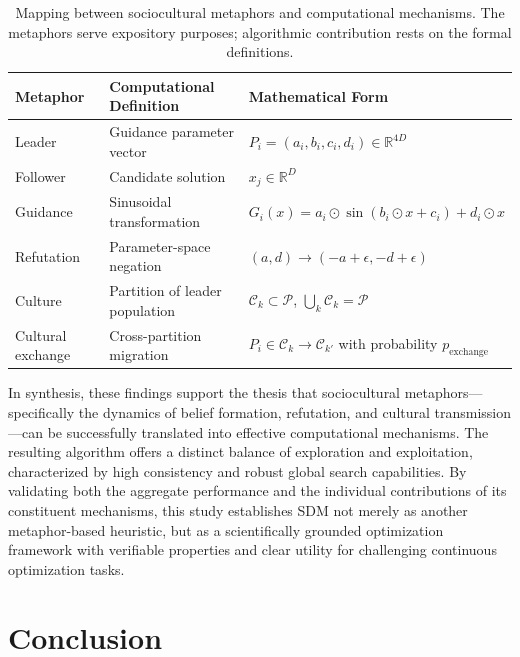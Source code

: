 \documentclass[11pt]{article}
\begin{document}
\begin{table}[ht]
\centering
\caption{Mapping between sociocultural metaphors and computational mechanisms. The metaphors serve expository purposes; algorithmic contribution rests on the formal definitions.}
\label{tab:metaphor_mapping}
\small
\begin{tabular}{@{}lll@{}}
\toprule
\textbf{Metaphor} & \textbf{Computational Definition} & \textbf{Mathematical Form} \\
\midrule
Leader & Guidance parameter vector & $P_i = (a_i, b_i, c_i, d_i) \in \mathbb{R}^{4D}$ \\
Follower & Candidate solution & $x_j \in \mathbb{R}^D$ \\
Guidance & Sinusoidal transformation & $G_i(x) = a_i \odot \sin(b_i \odot x + c_i) + d_i \odot x$ \\
Refutation & Parameter-space negation & $(a, d) \to (-a + \epsilon, -d + \epsilon)$ \\
Culture & Partition of leader population & $\mathcal{C}_k \subset \mathcal{P}$, $\bigcup_k \mathcal{C}_k = \mathcal{P}$ \\
Cultural exchange & Cross-partition migration & $P_i \in \mathcal{C}_k \to \mathcal{C}_{k'}$ with probability $p_{\text{exchange}}$ \\
\bottomrule
\end{tabular}
\end{table}

In synthesis, these findings support the thesis that sociocultural metaphors---specifically the dynamics of belief formation, refutation, and cultural transmission---can be successfully translated into effective computational mechanisms. The resulting algorithm offers a distinct balance of exploration and exploitation, characterized by high consistency and robust global search capabilities. By validating both the aggregate performance and the individual contributions of its constituent mechanisms, this study establishes SDM not merely as another metaphor-based heuristic, but as a scientifically grounded optimization framework with verifiable properties and clear utility for challenging continuous optimization tasks.

\section{Conclusion}
\label{sec:conclusion}
\end{document}
